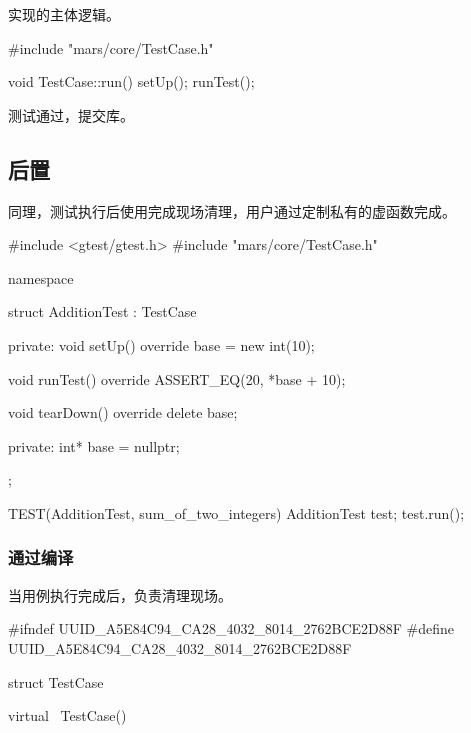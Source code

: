 \begin{content}
实现的主体逻辑。

\begin{leftbar}
 \begin{c++}[caption={\ttfamily{src/mars/core/TestCase.cc}}]
#include "mars/core/TestCase.h"

void TestCase::run() {
  setUp();
  runTest();
}

 \end{c++}
\end{leftbar}

测试通过，提交库。

\subsection{后置}

同理，测试执行后使用完成现场清理，用户通过定制私有的虚函数完成。

\begin{leftbar}
 \begin{c++}[caption={\ttfamily{test/mars/core/TestCaseSpec.cc}}]
#include <gtest/gtest.h>
#include "mars/core/TestCase.h"

namespace {
  struct AdditionTest : TestCase {
  private:
    void setUp() override {
      base = new int(10);
    }

    void runTest() override {
      ASSERT_EQ(20, *base + 10);
    }

    void tearDown() override {
      delete base;
    }

  private:
    int* base = nullptr;
  };
}

TEST(AdditionTest, sum_of_two_integers) {
  AdditionTest test;
  test.run();
}
 \end{c++}
\end{leftbar}

\subsubsection{通过编译}

当用例执行完成后，负责清理现场。

\begin{leftbar}
 \begin{c++}[caption={\ttfamily{include/mars/core/TestCase.h}}]
#ifndef UUID_A5E84C94_CA28_4032_8014_2762BCE2D88F
#define UUID_A5E84C94_CA28_4032_8014_2762BCE2D88F

struct TestCase {
  virtual ~TestCase() {}

}
\end{c++}
\end{leftbar}
\end{content}
